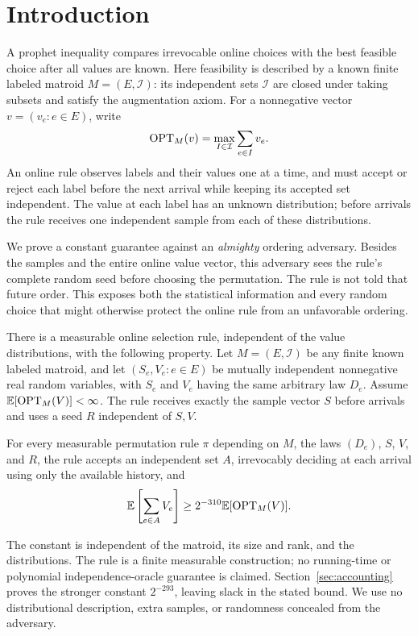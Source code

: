 \section{Introduction}

A prophet inequality compares irrevocable online choices with the best
feasible choice after all values are known. Here feasibility is described
by a known finite labeled matroid $M=(E,\mathcal I)$: its independent sets
$\mathcal I$ are closed under taking subsets and satisfy the augmentation
axiom. For a nonnegative vector $v=(v_e:e\in E)$, write
\[
 \operatorname{OPT}_M(v)=\max_{I\in\mathcal I}\sum_{e\in I}v_e.
\]
An online rule observes labels and their values one at a time, and must
accept or reject each label before the next arrival while keeping its
accepted set independent. The value at each label has an unknown
distribution; before arrivals the rule receives one independent sample
from each of these distributions.

We prove a constant guarantee against an \emph{almighty} ordering
adversary. Besides the samples and the entire online value vector, this
adversary sees the rule's complete random seed before choosing the
permutation. The rule is not told that future order. This exposes both
the statistical information and every random choice that might otherwise
protect the online rule from an unfavorable ordering.

\begin{theorem}\label{thm:main}
There is a measurable online selection rule, independent of the value
distributions, with the following property. Let $M=(E,\mathcal I)$ be any
finite known labeled matroid, and let $(S_e,V_e:e\in E)$ be mutually
independent nonnegative real random variables, with $S_e$ and $V_e$ having
the same arbitrary law $D_e$. Assume
$\mathbb E[\operatorname{OPT}_M(V)]<\infty$. The rule receives exactly the sample vector $S$
before arrivals and uses a seed $R$ independent of $S,V$.

For every measurable permutation rule $\pi$ depending on $M$, the laws
$(D_e)$, $S$, $V$, and $R$, the rule accepts an independent set $A$,
irrevocably deciding at each arrival using only the available history, and
\begin{equation}\label{eq:main}
 \mathbb E\left[\sum_{e\in A}V_e\right]
       \ge 2^{-310}\mathbb E[\operatorname{OPT}_M(V)].
\end{equation}
\end{theorem}

The constant is independent of the matroid, its size and rank, and the
distributions. The rule is a finite measurable construction; no
running-time or polynomial independence-oracle guarantee is claimed.
Section~\ref{sec:accounting} proves the stronger constant $2^{-293}$,
leaving slack in the stated bound. We use no distributional description, extra samples, or
randomness concealed from the adversary.

